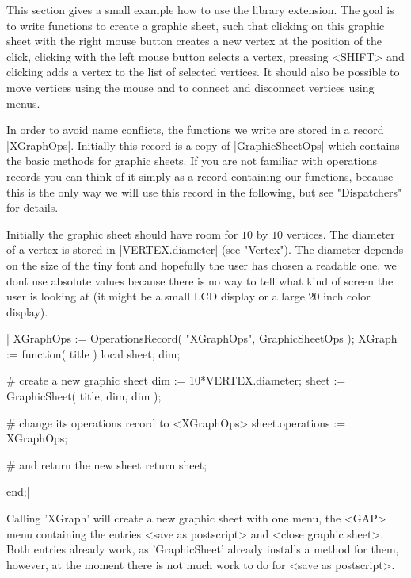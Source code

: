
This  section  gives a small   example  how to  use the  {\XGAP}  library
extension.  The goal  is to write functions  to  create a  graphic sheet,
such  that clicking  on this  graphic sheet  with  the right mouse button
creates a new vertex at the position of the click, clicking with the left
mouse button  selects a vertex,   pressing <SHIFT>  and clicking  adds  a
vertex to the list  of selected vertices.  It should  also be possible to
move  vertices using  the mouse and  to  connect  and disconnect vertices
using menus.

In order to avoid name conflicts, the functions we write  are stored in a
record |XGraphOps|.  Initially this record is a copy of |GraphicSheetOps|
which contains  the  basic methods  for  graphic sheets.  If  you are not
familiar with operations records  you can think of  it simply as a record
containing our functions, because this  is the only way  we will use this
record in the following, but see "Dispatchers" for details.

Initially the graphic  sheet should have  room for $10$ by $10$ vertices.
The  diameter of a vertex is  stored in |VERTEX.diameter| (see "Vertex").
The diameter depends on the size of the tiny  font and hopefully the user
has chosen a readable one, we don\'t use absolute values because there is
no way to tell what kind of screen the user is  looking at (it might be a
small LCD display or a large 20 inch color display).

|    XGraphOps := OperationsRecord( "XGraphOps", GraphicSheetOps );
    XGraph := function( title )
        local   sheet,  dim;
 
        # create a new graphic sheet
        dim   := 10*VERTEX.diameter;
        sheet := GraphicSheet( title, dim, dim );
 
        # change its operations record to <XGraphOps>
        sheet.operations := XGraphOps;
 
        # and return the new sheet
        return sheet;
 
    end;|

Calling 'XGraph' will create a new graphic sheet with one menu, the <GAP>
menu  containing the entries <save    as postscript> and <close   graphic
sheet>.  Both entries already work, as  'GraphicSheet' already installs a
method for them, however, at the moment there is not much  work to do for
<save as postscript>.

